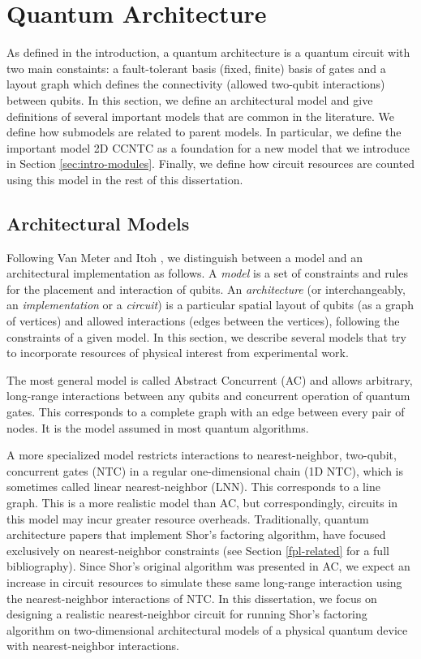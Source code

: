 \section{Quantum Architecture}
\label{sec:intro-arch}

As defined in the introduction, a quantum architecture is a quantum circuit
with two main constaints: a fault-tolerant basis (fixed, finite) basis of
gates and a layout graph which defines the connectivity (allowed two-qubit
interactions) between qubits.
In this section, we define an architectural model and give definitions of
several important models that are common in the literature. We define
how submodels are related to parent models. In particular, we define the
important model \textsf{2D CCNTC} as a foundation for a new model that we
introduce in Section \ref{sec:intro-modules}. Finally, we define how
circuit resources are counted using this model in the rest of this
dissertation.

\subsection{Architectural Models}
\label{subsec:models}

Following Van Meter and Itoh \cite{VanMeter2005},
we distinguish between a model and an architectural implementation as follows.
A \emph{model} is a set of constraints and rules for the placement and
interaction of qubits.
An \emph{architecture} (or interchangeably, an \emph{implementation} 
or a \emph{circuit}) is a particular
spatial layout of qubits (as a graph of vertices) and allowed interactions (edges between the vertices),
following the constraints of a given model. In this section, we describe
several models that try to incorporate resources of physical interest from
experimental work.

The most general model is called Abstract Concurrent (\textsf{AC})
and allows arbitrary, long-range interactions between any qubits and concurrent
operation of quantum gates.
This corresponds to a complete graph with an edge between every pair of nodes.
It is the model assumed in most quantum algorithms.

A more specialized model restricts interactions to nearest-neighbor, two-qubit,
concurrent gates (\textsf{NTC}) in a regular one-dimensional chain (\textsf{1D NTC}),
which is sometimes called linear nearest-neighbor (\textsf{LNN}).
This corresponds to a line graph. This is a more realistic model than
\textsf{AC}, but correspondingly, circuits in this model may incur greater
resource overheads.
Traditionally, quantum architecture papers that
implement Shor's factoring algorithm, have focused exclusively on
nearest-neighbor constraints (see Section \ref{fpl-related} for a full
bibliography). Since Shor's original algorithm was
presented in \textsf{AC}, we expect an increase in circuit resources to
simulate these same long-range interaction using the nearest-neighbor
interactions of \textsf{NTC}.
In this dissertation, we focus on designing a realistic nearest-neighbor circuit for running
Shor's factoring algorithm on two-dimensional
architectural models of a physical quantum device with nearest-neighbor
interactions.



